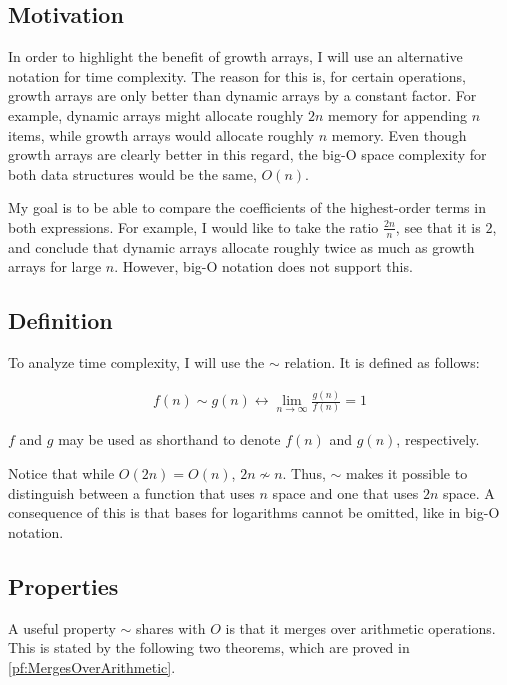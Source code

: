 \subsection{Motivation}

In order to highlight the benefit of growth arrays, I will use an alternative notation for time complexity. The reason for this is, for certain operations, growth arrays are only better than dynamic arrays by a constant factor. For example, dynamic arrays might allocate roughly $2n$ memory for appending $n$ items, while growth arrays would allocate roughly $n$ memory. Even though growth arrays are clearly better in this regard, the big-O space complexity for both data structures would be the same, $O(n)$.

My goal is to be able to compare the coefficients of the highest-order terms in both expressions. For example, I would like to take the ratio $\frac{2n}{n}$, see that it is $2$, and conclude that dynamic arrays allocate roughly twice as much as growth arrays for large $n$. However, big-O notation does not support this.

\subsection{Definition}

To analyze time complexity, I will use the $\sim$ relation. It is defined as follows:

\begin{align*}
f(n) \sim g(n) \leftrightarrow \lim_{n \to \infty} \frac{g(n)}{f(n)} = 1
\end{align*}

$f$ and $g$ may be used as shorthand to denote $f(n)$ and $g(n)$, respectively.

Notice that while $O(2n) = O(n)$, $2n \not\sim n$. Thus, $\sim$ makes it possible to distinguish between a function that uses $n$ space and one that uses $2n$ space. {\HdrNote} A consequence of this is that bases for logarithms cannot be omitted, like in big-O notation.

\subsection{Properties}
\label{subsec:AsymptoticProperties}

A useful property $\sim$ shares with $O$ is that it merges over arithmetic operations. This is stated by the following two theorems, which are proved in \ref{pf:MergesOverArithmetic}.

